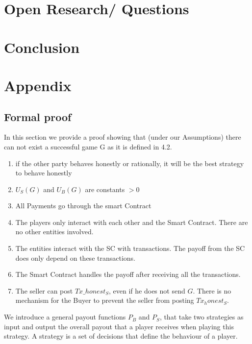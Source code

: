 \documentclass{cacthesis}
\begin{document}
\chapter{Open Research/ Questions}

\chapter{Conclusion}

\chapter{Appendix}

\section{Formal proof}
\label{sec:formal-proof}
In this section we provide a proof showing that (under our Assumptions) there can not exist  a successful game G as it is defined in 4.2.

\begin{enumerate}
    \item if the other party behaves honestly or rationally, it will be the best strategy to behave honestly
    \item $U_S(G)$ and $U_B(G)$ are constants $> 0$
    \item All Payments go through the smart Contract
    \item The players only interact with each other and the Smart Contract. There are no other entities involved.
    \item The entities interact with the SC with transactions. The payoff from the SC does only depend on these transactions.
    \item The Smart Contract handles the payoff after receiving all the transactions.
    \item The seller can post $Tx\_honest_S$, even if he does not send $G$. There is no mechanism for the Buyer to prevent the seller from posting $Tx_honest_S$.

\end{enumerate}


We introduce a general payout functions $P_B$ and $P_S$, that take two strategies as input and output the overall payout that a player receives when playing this strategy.\newline
A strategy is a set of decisions that define the behaviour of a player. %
\end{document}
